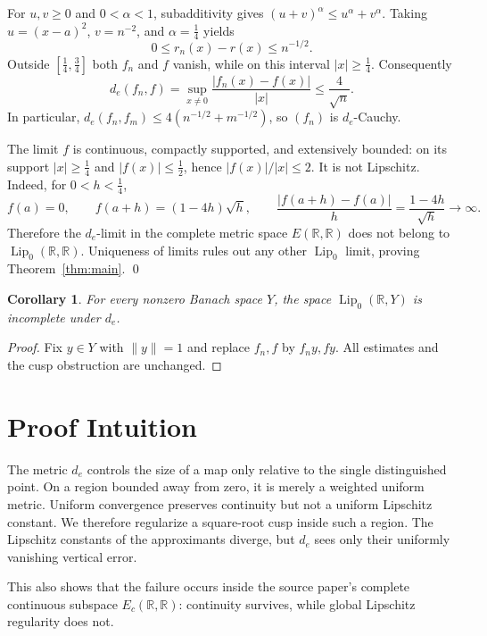 \documentclass[11pt]{article}
\newtheorem{corollary}{Corollary}
\newcommand{\Lip}{\operatorname{Lip}}
\newcommand{\R}{\mathbb R}
\begin{document}
For $u,v\ge0$ and $0<\alpha<1$, subadditivity gives
$(u+v)^\alpha\le u^\alpha+v^\alpha$.  Taking
$u=(x-a)^2$, $v=n^{-2}$, and $\alpha=\tfrac14$ yields
\[
 0\le r_n(x)-r(x)\le n^{-1/2}.
\]
Outside $[\tfrac14,\tfrac34]$ both $f_n$ and $f$ vanish, while on this
interval $|x|\ge\tfrac14$.  Consequently
\begin{equation}\label{conv}
 d_e(f_n,f)
 =\sup_{x\ne0}\frac{|f_n(x)-f(x)|}{|x|}
 \le \frac4{\sqrt n}.                                  \tag{1}
\end{equation}
In particular,
$d_e(f_n,f_m)\le4(n^{-1/2}+m^{-1/2})$, so $(f_n)$ is $d_e$-Cauchy.

The limit $f$ is continuous, compactly supported, and extensively bounded:
on its support $|x|\ge\tfrac14$ and $|f(x)|\le\tfrac12$, hence
$|f(x)|/|x|\le2$.  It is not Lipschitz.  Indeed, for
$0<h<\tfrac14$,
\[
 f(a)=0,\qquad f(a+h)=(1-4h)\sqrt h,\qquad
 \frac{|f(a+h)-f(a)|}{h}=\frac{1-4h}{\sqrt h}\longrightarrow\infty.
\]
Therefore the $d_e$-limit in the complete metric space $E(\R,\R)$ does not
belong to $\Lip_0(\R,\R)$.  Uniqueness of limits rules out any other
$\Lip_0$ limit, proving Theorem~\ref{thm:main}. \qed

\begin{corollary}
For every nonzero Banach space $Y$, the space $\Lip_0(\R,Y)$ is incomplete
under $d_e$.
\end{corollary}
\begin{proof}
Fix $y\in Y$ with $\|y\|=1$ and replace $f_n,f$ by $f_ny,fy$.
All estimates and the cusp obstruction are unchanged.
\end{proof}

\section*{Proof Intuition}

The metric $d_e$ controls the size of a map only relative to the single
distinguished point.  On a region bounded away from zero, it is merely a
weighted uniform metric.  Uniform convergence preserves continuity but not
a uniform Lipschitz constant.  We therefore regularize a square-root cusp
inside such a region.  The Lipschitz constants of the approximants diverge,
but $d_e$ sees only their uniformly vanishing vertical error.

This also shows that the failure occurs inside the source paper's complete
continuous subspace $E_c(\R,\R)$: continuity survives, while global
Lipschitz regularity does not.
\end{document}

